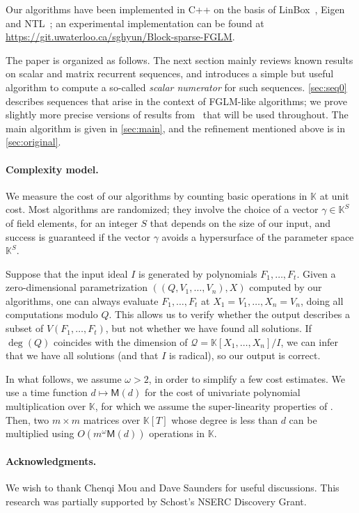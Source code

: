 \documentclass[12pt]{article}
\newcommand{\lf}{X}
\newcommand{\residueI}{\mathscr{Q}}
\newcommand{\sqfree}{Q}
\def\M {\ensuremath{\mathsf{M}}}
\def\K{\mathbb{K}}
\def\K {\ensuremath{\mathbb{K}}}
\begin{document}
Our algorithms have been implemented in C++ on the basis of
LinBox~\cite{LinBox}, Eigen~\cite{Eigen} and NTL~\cite{NTL}; an experimental
implementation can be found at
\url{https://git.uwaterloo.ca/sghyun/Block-sparse-FGLM}.

The paper is organized as follows. The next section mainly reviews
known results on scalar and matrix recurrent sequences, and introduces
a simple but useful algorithm to compute a so-called {\em scalar
  numerator} for such sequences. \cref{sec:seq0} describes sequences
that arise in the context of FGLM-like algorithms; we prove slightly
more precise versions of results from~\cite{BoSaSc03} that will be 
used throughout. The main algorithm is given in \cref{sec:main},
and the refinement mentioned above is in \cref{sec:original}.


\paragraph{Complexity model.}
We measure the cost of our algorithms by counting basic operations in
$\K$ at unit cost. Most algorithms are randomized; they involve the
choice of a vector $\gamma \in \K^S$ of field elements, for an integer
$S$ that depends on the size of our input, and success is guaranteed
if the vector $\gamma$ avoids a hypersurface of the parameter space
$\K^S$.

Suppose that the input ideal $I$ is generated by polynomials
$F_1,\dots,F_t$.  Given a zero-dimensional parametrization
$((\sqfree,V_1,\dots,V_n),\lf)$ computed by our algorithms, one can
always evaluate $F_1,\dots,F_t$ at $X_1 =V_1,\dots,X_n=V_n$, doing all
computations modulo $\sqfree$. This allows us to verify whether the
output describes a subset of $V(F_1,\dots,F_t)$, but not whether we
have found all solutions.  If $\deg(Q)$ coincides with the dimension
of $\residueI=\K[X_1,\dots,X_n]/I$, we can infer that we have all
solutions (and that $I$ is radical), so our output is correct.

In what follows, we assume $\omega>2$, in order to simplify a few cost
estimates. We use a time function $d \mapsto \M(d)$ for the cost of
univariate polynomial multiplication over $\K$, for which we assume
the super-linearity properties of \cite[Section~8.4]{GaGe13}.  Then,
two $m\times m$ matrices over $\K[T]$ whose degree is less than $d$
can be multiplied using $O(m^\omega \M(d))$ operations in $\K$.

\paragraph{Acknowledgments.} We wish to thank Chenqi Mou and Dave Saunders for useful
discussions. This research was partially supported by Schost's NSERC
Discovery Grant.
\end{document}
